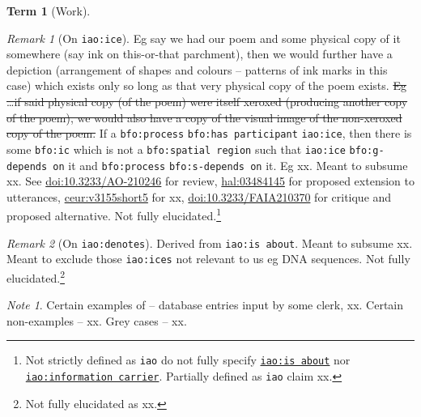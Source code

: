 \documentclass{amsart}%
\newcommand{\code}[1]{\texttt{#1}}%
\theoremstyle{plain}
\theoremstyle{definition}
\theoremstyle{remark}
\newtheorem*{note}{Note}
\theoremstyle{definition}
\newtheorem{term}{Term}[subsection]%
\theoremstyle{remark}
\newtheorem*{term-note}{Remark}
\begin{document}
\begin{term}[Work]
\begin{term-note}[On \code{iao:ice}]
{%
Eg say we had our poem and some physical copy of it somewhere (say ink on this-or-that parchment), then we would further have a depiction (arrangement of shapes and colours -- patterns of ink marks in this case) which exists only so long as that very physical copy of the poem exists. \sout{Eg \ldots if said physical copy (of the poem) were itself xeroxed (producing another copy of the poem), we would also have a copy of the visual image of the non-xeroxed copy of the poem.} %
%
%
If a \code{bfo:process} \code{bfo:has participant} \code{iao:ice}, then there is some \code{bfo:ic} which is not a \code{bfo:spatial region} such that \code{iao:ice} \code{bfo:g-depends on} it and \code{bfo:process} \code{bfo:s-depends on} it. Eg xx.} Meant to subsume xx. See \href{https://doi.org/10.3233/AO-210246}{doi:10.3233/AO-210246} for review, \href{https://hal.science/hal-03484145}{hal:03484145} for proposed extension to utterances, \href{https://ceur-ws.org/Vol-3155/short5.pdf}{ceur:v3155short5} for xx, \href{https://doi.org/10.3233/FAIA210370}{doi:10.3233/FAIA210370} for critique and proposed alternative. Not fully elucidated.\footnote{Not strictly defined as \code{iao} do not fully specify \href{http://purl.obolibrary.org/obo/IAO_0000136}{\code{iao:is about}} nor \href{http://purl.obolibrary.org/obo/IAO_0000015}{\code{iao:information carrier}}. %
%
%
Partially defined as \code{iao} claim xx.}
\end{term-note}
\begin{term-note}[On \code{iao:denotes}]
Derived from \code{iao:is about}. Meant to subsume xx. Meant to exclude those \code{iao:ices} not relevant to us eg DNA sequences. Not fully elucidated.\footnote{Not fully elucidated as xx.}
\end{term-note}
\begin{note}
Certain examples of -- database entries input by some clerk, xx. Certain non-examples -- xx. Grey cases -- xx.%
\end{note}
\end{term}
%
%
%
%
%
\end{document}
